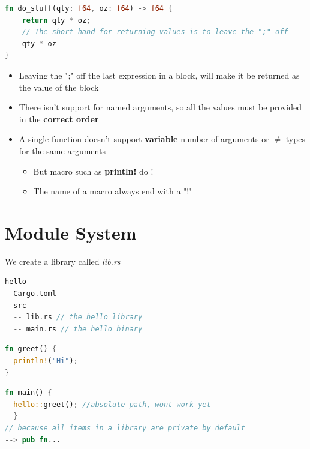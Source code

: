 \documentclass{report}
\begin{document}
\begin{multicols*}{2}
\begin{tcolorbox}[colback=backcolour,size=small,left=4mm]
\begin{lstlisting}[language=rust]
fn do_stuff(qty: f64, oz: f64) -> f64 {
	return qty * oz;
	// The short hand for returning values is to leave the ";" off
	qty * oz
}
\end{lstlisting}
\end{tcolorbox}

\begin{itemize}
	\item Leaving the ";" off the last expression in a block, will make it be returned as the value of the block
	\item There isn't support for named arguments, so all the values must be provided in the \textbf{correct order}
	\item A single function doesn't support \textbf{variable} number of arguments or $\not =$ types for the same arguments
		\begin{itemize} 
			\item But macro such as \textbf{println!} do ! 
			\item The name of a macro always end with a "!"
		\end{itemize}
\end{itemize}

\section{Module System}

We create a library called \textit{lib.rs} 

\begin{tcolorbox}[title=,colback=backcolour,size=small,left=4mm]
\begin{lstlisting}[language=rust]
hello
--Cargo.toml
--src
  -- lib.rs // the hello library
  -- main.rs // the hello binary
\end{lstlisting}
\end{tcolorbox}

\begin{tcolorbox}[title=In lib.rs,colback=backcolour,size=small,left=4mm]
\begin{lstlisting}[language=rust]
fn greet() {
  println!("Hi");
}
\end{lstlisting}
\end{tcolorbox}

\begin{tcolorbox}[title=To call it in main.rs,colback=backcolour,size=small,left=4mm]
\begin{lstlisting}[language=rust]
fn main() {
  hello::greet(); //absolute path, wont work yet
  }
// because all items in a library are private by default
--> pub fn...
\end{lstlisting}
\end{tcolorbox}


\end{multicols*}
\end{document}
